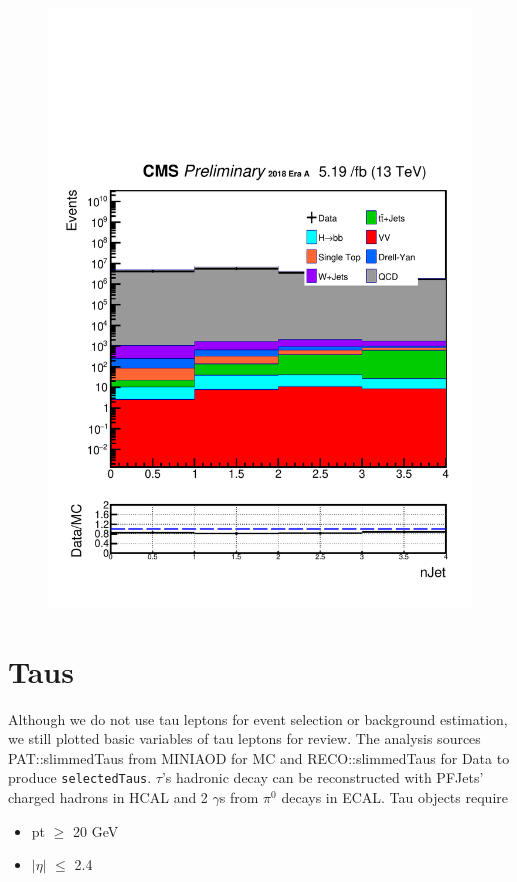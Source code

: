\begin{figure}[h!]
  \includegraphics[width=0.47\linewidth]{figs/Data_log_AnalysisNote_MS-15_ctauS-10_nJet.pdf}
\end{figure}

\section{Taus}\label{sec:taus}
Although we do not use tau leptons for event selection or background estimation, we still plotted basic variables of tau leptons for review. 
The analysis sources PAT::slimmedTaus from MINIAOD for MC and RECO::slimmedTaus for Data to produce {\tt selectedTaus}.
$\tau$'s hadronic decay can be reconstructed with PFJets' charged hadrons in HCAL and 2 $\gamma$s from $\pi^{0}$ decays in ECAL.  
Tau objects require
\begin{itemize}
  \item pt $\geq$ 20 GeV
  \item $|\eta|$ $\leq$ 2.4
\end{itemize}

